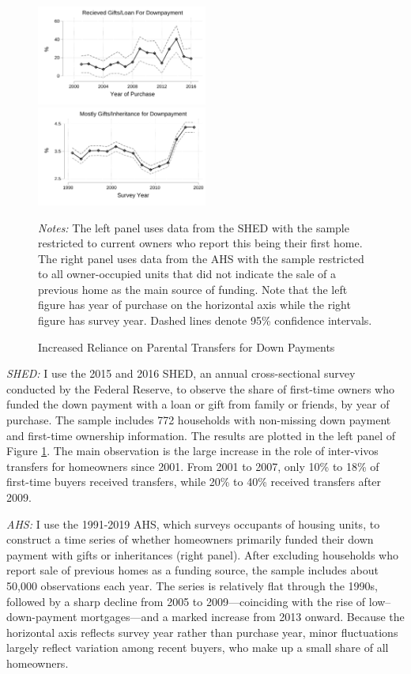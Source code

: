 \documentclass[12pt]{article}
\begin{document}
\begin{figure}
	\caption{Increased Reliance on Parental Transfers for Down Payments}\label{fig:motivation}
	\includegraphics[width=0.5\textwidth]{../tabfig/descr/SHED_gift_scatter_SE_paper}%
	\includegraphics[width=0.5\textwidth]{../tabfig/descr/AHS_majorsourcedown_surveyyear_paper}%
	
	 {\begin{footnotesize} \textit{Notes:} The left panel uses data from the SHED with the sample restricted to current owners who report this being their first home. The right panel uses data from the AHS with the sample restricted to all owner-occupied units that did not indicate the sale of a previous home as the main source of funding.  Note that the left figure has year of purchase on the horizontal axis while the right figure has survey year. Dashed lines denote 95\% confidence intervals.\end{footnotesize}}
\end{figure}

\textit{SHED:} I use the 2015 and 2016 SHED, an annual cross-sectional survey conducted by the Federal Reserve, to observe the share of first-time owners who funded the down payment with a loan or gift from family or friends, by year of purchase. The sample includes 772 households with non-missing down payment and first-time ownership information. The results are plotted in the left panel of Figure \ref{fig:motivation}. The main observation is the large increase in the role of inter-vivos transfers for homeowners since 2001. From 2001 to 2007, only 10\% to 18\% of first-time buyers received transfers, while 20\% to 40\% received transfers after 2009.

\textit{AHS:} I use the 1991-2019 AHS, which surveys occupants of housing units, to construct a time series of whether homeowners primarily funded their down payment with gifts or inheritances (right panel). After excluding households who report sale of previous homes as a funding source, the sample includes about 50,000 observations each year. The series is relatively flat through the 1990s, followed by a sharp decline from 2005 to 2009---coinciding with the rise of low–down-payment mortgages---and a marked increase from 2013 onward. Because the horizontal axis reflects survey year rather than purchase year, minor fluctuations largely reflect variation among recent buyers, who make up a small share of all homeowners.
\end{document}
